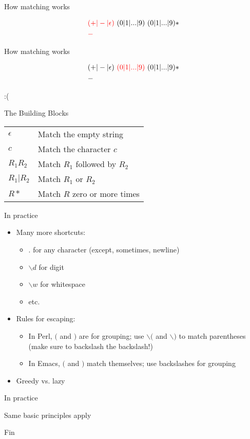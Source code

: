 \documentclass{beamer}
\renewcommand\big[1]{
  \begin{center}
    \Large{#1}
  \end{center}
}
\begin{document}
\begin{frame}
  \big{How matching works}

  \begin{align*}
    & \textcolor{red}{(+ \vert - \vert \epsilon)}~(0 \vert 1 \vert ... \vert 9)~(0 \vert 1 \vert ... \vert 9)* \\
    & \textcolor{red}{-}
  \end{align*}
\end{frame}

\begin{frame}
  \big{How matching works}

  \begin{align*}
    & (+ \vert - \vert \epsilon)~\textcolor{red}{(0 \vert 1 \vert ... \vert 9)}~(0 \vert 1 \vert ... \vert 9)* \\
    & {-}
  \end{align*}

  \centering\Huge{:(}
\end{frame}

\begin{frame}
  \big{The Building Blocks}
  \begin{center}
    \begin{tabular}{ll}
      $\epsilon$ & Match the empty string \\
      $c$ & Match the character $c$ \\
      $R_1 R_2$ & Match $R_1$ followed by $R_2$ \\
      $R_1 \vert R_2$ & Match $R_1$ or $R_2$ \\
      $R*$ & Match $R$ zero or more times
    \end{tabular}
  \end{center}
\end{frame}

\begin{frame}
  \big{In practice}
  \begin{itemize}
    \item Many more shortcuts:
    \begin{itemize}
      \item $.$ for any character (except, sometimes, newline)
      \item $\backslash{}d$ for digit
      \item $\backslash{}w$ for whitespace
      \item etc.
    \end{itemize}
    \item Rules for escaping:
    \begin{itemize}
        \item In Perl, $($ and $)$ are for grouping; use $\backslash{}($ and $\backslash{})$ to match parentheses (make sure to backslash the backslash!)
      \item In Emacs, $($ and $)$ match themselves; use backslashes for grouping
    \end{itemize}
    \item Greedy vs. lazy
  \end{itemize}
\end{frame}

\begin{frame}
  \big{In practice}

  \big{Same basic principles apply}
  \pause
\end{frame}

\begin{frame}
  \centering\Huge{Fin}
\end{frame}
\end{document}
